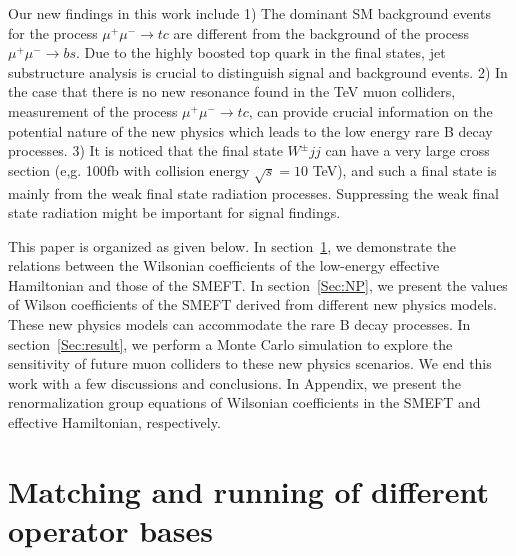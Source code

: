 \documentclass[a4paper,11pt]{article}
\begin{document}
Our new findings in this work include 
1) The dominant SM background events for the process $\mu^+\mu^-\to tc$ are different from the background of the process $\mu^+\mu^-\to bs$. 
Due to the highly boosted top quark in the final states, jet substructure analysis is crucial to distinguish signal and background events. 
2) In the case that there is no new resonance found in the TeV muon colliders, measurement of the process $\mu^+\mu^-\to tc$, 
can provide crucial information on the potential nature of the new physics which leads to the low energy rare B decay processes. 
3) It is noticed that the final state $W^\pm jj $ can have a very large cross section (e,g. 100fb with collision energy $\sqrt{s}=10$ TeV), 
and such a final state is mainly from the weak final state radiation processes. 
Suppressing the weak final state radiation might be important for signal findings.

This paper is organized as given below. 
In section~\ref{Sec:EFT}, we demonstrate the relations between the Wilsonian coefficients of the low-energy effective Hamiltonian and those of the SMEFT. 
In section~\ref{Sec:NP}, we present the values of Wilson coefficients of the SMEFT derived from different new physics models. 
These new physics models can accommodate the rare B decay processes. 
In section~\ref{Sec:result}, we perform a Monte Carlo simulation to explore the sensitivity of future muon colliders to these new physics scenarios. 
We end this work with a few discussions and conclusions. 
In Appendix, we present the renormalization group equations of Wilsonian coefficients in the SMEFT and effective Hamiltonian, respectively. 

\section{Matching and running of different operator bases}
\label{Sec:EFT}
\end{document}
